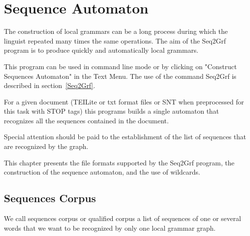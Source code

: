 \chapter{Sequence Automaton}
\label{chap-sequence-automaton}


The construction of local grammars can be a long process during which the linguist repeated many times the same operations. The aim of the Seq2Grf program is to produce quickly and automatically local grammars.


\bigskip
\noindent This program can be used in command line mode or by clicking on "Construct Sequences Automaton" in the Text Menu.
The use of the command Seq2Grf is described in section~\ref{Seq2Grf}.

\bigskip
\noindent For a given document (TEILite or txt format files or SNT when preprocessed for this task with {STOP} tags) this programs builds a single automaton that recognizes all the sequences contained in the document.

\bigskip
\noindent Special attention should be paid to the establishment of the list of sequences that are recognized by the graph.

\bigskip
\noindent This chapter presents the file formats supported by the Seq2Grf program, the construction of the sequence automaton, and the use of wildcards.
\bigskip


\section{Sequences Corpus}
We call sequences corpus or qualified corpus a list of sequences of one or several words that we want to be recognized by only one local grammar graph. 
\bigskip

